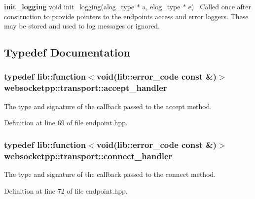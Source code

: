 {\bfseries init\+\_\+logging} {\ttfamily void init\+\_\+logging(alog\+\_\+type $\ast$ a, elog\+\_\+type $\ast$ e)}~\newline
Called once after construction to provide pointers to the endpoint\textquotesingle{}s access and error loggers. These may be stored and used to log messages or ignored. 

\subsection{Typedef Documentation}
\hypertarget{namespacewebsocketpp_1_1transport_a9326ea831379368ee47841b2e46cb009}{}
\subsubsection[{accept\+\_\+handler}]{\setlength{\rightskip}{0pt plus 5cm}typedef lib\+::function$<$void(lib\+::error\+\_\+code const \&)$>$ {\bf websocketpp\+::transport\+::accept\+\_\+handler}}\label{namespacewebsocketpp_1_1transport_a9326ea831379368ee47841b2e46cb009}


The type and signature of the callback passed to the accept method. 



Definition at line 69 of file endpoint.\+hpp.

\hypertarget{namespacewebsocketpp_1_1transport_ac392fca34e946b48414278c0c3addfa5}{}
\subsubsection[{connect\+\_\+handler}]{\setlength{\rightskip}{0pt plus 5cm}typedef lib\+::function$<$void(lib\+::error\+\_\+code const \&)$>$ {\bf websocketpp\+::transport\+::connect\+\_\+handler}}\label{namespacewebsocketpp_1_1transport_ac392fca34e946b48414278c0c3addfa5}


The type and signature of the callback passed to the connect method. 



Definition at line 72 of file endpoint.\+hpp.

\hypertarget{namespacewebsocketpp_1_1transport_a6658447b2e10f4c712dd792aad0e0c78}{}
